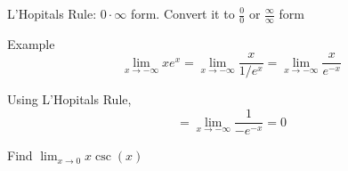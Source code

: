 \documentclass{homework}
\begin{document}
\maketitle

L'Hopitals Rule: $0\cdot\infty$ form. Convert it to $\frac{0}{0}$ or $\frac{\infty}{\infty}$ form

Example
$$\lim_{x\to-\infty} xe^{x}=\lim_{x\to-\infty} \frac{x}{1/e^{x}}=\lim_{x\to-\infty}\frac{x}{e^{-x}}$$

Using L'Hopitals Rule,
$$=\lim_{x\to-\infty}\frac{1}{-e^{-x}}=0$$


\question

Find $\displaystyle{\lim_{x\to 0} x\csc(x)}$
\end{document}
